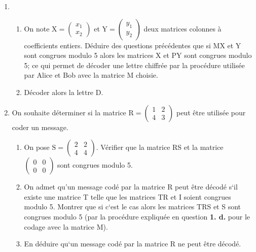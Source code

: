 \documentclass[10pt]{article}
\begin{document}
\begin{enumerate}[start=2]
	\item[]	\begin{enumerate}[start=4]
		\item On note $\text{X}= \begin{pmatrix} x_1\\x_2 \end{pmatrix}$ et $\text{Y} = \begin{pmatrix} y_1\\y_2 \end{pmatrix}$ deux matrices colonnes à coefficients entiers. Déduire des questions précédentes que si MX et Y sont congrues modulo 5 alors les matrices X et PY sont congrues modulo 5; ce qui permet de \og{}décoder\fg{} une lettre chiffrée par la procédure utilisée par Alice et Bob avec la matrice M choisie.
		
		\item Décoder alors la lettre \og{}\textsf{D}\fg{}.
	\end{enumerate}
	\item On souhaite déterminer si la matrice $\text{R}=\begin{pmatrix} 1&2\\4&3	\end{pmatrix}$ peut être utilisée pour coder un message.
	\begin{enumerate}
		\item On pose $\text{S} = \begin{pmatrix} 2&2\\4&4	\end{pmatrix}$. Vérifier que la matrice RS et la matrice $\begin{pmatrix} 0&0\\0&0	\end{pmatrix}$ sont congrues modulo 5. 
		
		\item On admet qu'un message codé par la matrice R peut être décodé s‘il existe une matrice T telle que les matrices TR et I soient congrues modulo 5.
		Montrer que si c‘est le cas alors les matrices TRS et S sont congrues modulo 5 (par la procédure expliquée en question \textbf{1. d.} pour le codage avec la matrice M).
		
		\item En déduire qu‘un message codé par la matrice R ne peut être décodé.
	\end{enumerate}
\end{enumerate}
\end{document}
